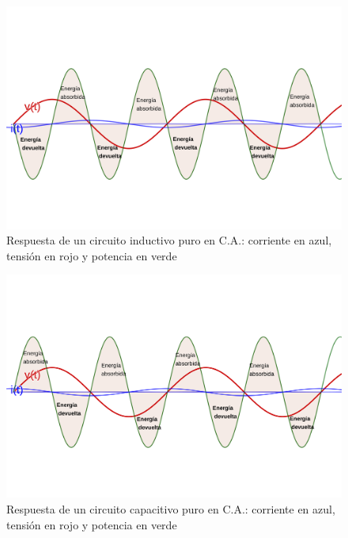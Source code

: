 \begin{figure}[htbp]
  \includegraphics[scale=0.1]{images/potencia_alterna_inductiva}
  \caption{Respuesta de un circuito inductivo puro en C.A.: corriente en azul, tensión en rojo y potencia en verde}
  \label{fig:potencia_alterna_inductiva}
\end{figure}

\begin{figure}[htbp]
  \includegraphics[scale=0.1]{images/potencia_alterna_capacitiva}
  \caption{Respuesta de un circuito capacitivo puro en C.A.: corriente en azul, tensión en rojo y potencia en verde}
  \label{fig:potencia_alterna_capacitiva}
\end{figure}

